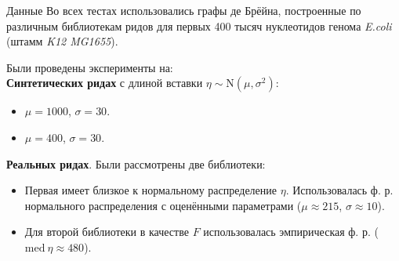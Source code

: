 \documentclass[unicode, notheorems]{beamer}
\begin{document}
\begin{frame}{Данные}			
		Во всех тестах использовались графы де Брёйна, построенные по различным библиотекам ридов для первых 400 тысяч нуклеотидов генома \textit{E.coli} (штамм \textit{K12 MG1655}).
		\medskip
		
		Были проведены эксперименты на:\\
		\smallskip
		\textbf{Синтетических ридах} с длиной вставки $\eta \sim \mathrm{N}(\mu, \sigma^2)$:
		\begin{itemize}
			\item $\mu = 1000$, $\sigma = 30$.
			\item $\mu = 400$, $\sigma = 30$.
		\end{itemize}
		\textbf{Реальных ридах}. Были рассмотрены две библиотеки:
		\begin{itemize}
				\item Первая имеет близкое к нормальному распределение $\eta$. Использовалась ф. р. нормального распределения с оценёнными параметрами ($\mu \approx 215$, $\sigma \approx 10$).
				\item Для второй библиотеки в качестве $F$ использовалась эмпирическая ф. р. ($\mathrm{med}\ \eta \approx 480$).
		\end{itemize}
\end{frame}
\end{document}
